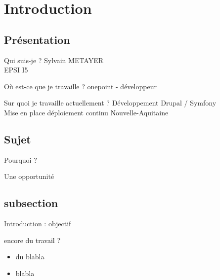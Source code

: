\section{Introduction}

\subsection{Présentation}
\begin{frame}{\subsecname}
	\begin{block}{Qui suis-je ?}
	Sylvain METAYER \\ 
	EPSI I5 
	\end{block}
	\pause
	\begin{block}{Où est-ce que je travaille ?}
	onepoint - développeur
	\end{block}
	\pause
	\begin{block}{Sur quoi je travaille actuellement ?}
	Développement Drupal / Symfony \\ 	
	Mise en place déploiement continu Nouvelle-Aquitaine
	\end{block}
\end{frame}

\subsection{Sujet}
\begin{frame}{\subsecname}
	 \begin{overprint}
			\begin{block}{Pourquoi ?}
			\end{block}
			\begin{block}{Une opportunité}
			\end{block}
	\end{overprint} 
\end{frame}

\subsection{subsection}
\begin{frame}{Introduction : objectif}

encore du travail ?

\begin{itemize}
    \item du blabla 
    \item blabla 
\end{itemize}


\end{frame}
